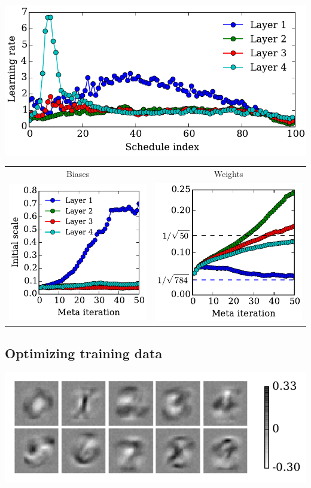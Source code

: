 \documentclass[landscape,a0b,final,a4resizeable]{include/a0poster}
\begin{document}
\begin{poster}
\begin{multicols}{3}
\includegraphics[width=0.5\columnwidth]{../experiments/Feb_3_training_schedules/3_adam_50/schedules_small.pdf}




\begin{center}
\begin{tabular}{cc}
 Biases & Weights \\
\hspace{-1em}\includegraphics[width=0.3\columnwidth]{../experiments/Feb_3_training_schedules/3_adam_50/init_bias_learning_curve.pdf} &
\hspace{-1em}\includegraphics[width=0.3\columnwidth]{../experiments/Feb_3_training_schedules/3_adam_50/init_weight_learning_curve.pdf}
\end{tabular}
\end{center}


\subsection{Optimizing training data}


\includegraphics[width=0.5\columnwidth]{../experiments/Jan_19_optimize_data/9_color_bar/fake_data.pdf}



\end{multicols}
\end{poster}
\end{document}
